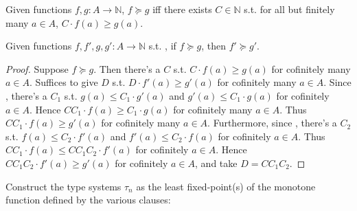\begin{definition}
  Given functions $f, g : A \to \mathbb{N}$, 
$f \succeq g$ iff there exists $C \in \mathbb{N}$ s.t. for all but finitely many $a \in A$,  
  $C \cdot f(a) \ge g(a)$.
\end{definition}

\begin{lemma}\label{lemma:dominance}
  Given functions $f,f',g, g' : A \to \mathbb{N}$ s.t. , if 
  $f \succeq g$, then $f' \succeq g'$.
\end{lemma}

\begin{proof}
  Suppose  $f \succeq g$. Then there's a $C$ s.t. 
  $C \cdot f(a) \ge g(a)$ for cofinitely many $a \in A$.
  Suffices to give $D$ s.t. $D \cdot f'(a) \ge g'(a)$ for cofinitely many $a \in A$.
  Since , there's a $C_1$ s.t. 
  $g(a) \le C_1 \cdot g'(a)$ and $g'(a) \le C_1 \cdot g(a)$ for cofinitely $a \in A$.
  Hence $C C_1 \cdot f(a) \ge C_1 \cdot g(a)$ for cofinitely many $a \in A$.
  Thus $C C_1 \cdot f(a) \ge g'(a)$ for cofinitely many $a \in A$. 
  Furthermore, since , there's a $C_2$ s.t. 
  $f(a) \le C_2 \cdot f'(a)$ and $f'(a) \le C_2 \cdot f(a)$ for cofinitely $a \in A$.
  Thus $C C_1 \cdot f(a) \le C C_1 C_2 \cdot f'(a)$ for cofinitely $a \in A$.
  Hence $C C_1 C_2 \cdot f'(a) \ge g'(a)$ for cofinitely $a \in A$, and take $D = C C_1 C_2$.
\end{proof}

Construct the type systems $\tau_n$ as the least fixed-point(s) of the 
monotone function defined by the various clauses: 


